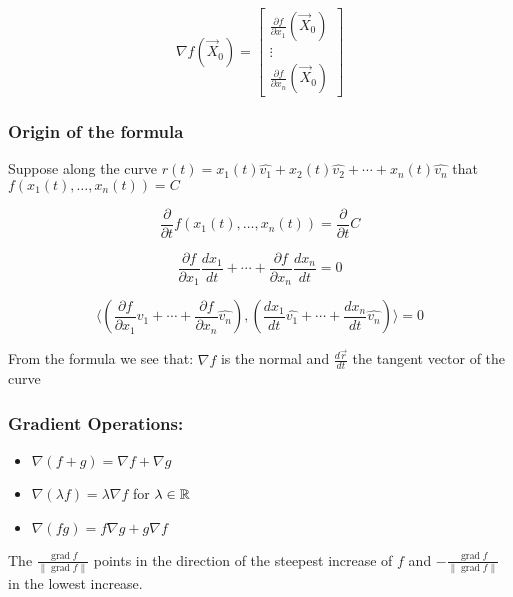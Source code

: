 \[
    \nabla f(\vec{X}_0) = \begin{bmatrix}
    \frac{\partial f}{\partial x_1}(\vec{X}_0) \\
    \vdots \\
    \frac{\partial f}{\partial x_n}(\vec{X}_0)
    \end{bmatrix}
\]

\subsubsection{Origin of the formula}

Suppose along the curve \(r(t) = x_1(t)\hat{v_1} + x_2(t)\hat{v_2} + \cdots + x_n(t)\hat{v_n}\) that 
\(f(x_1(t), \dots, x_n(t)) = C\)

\[
    \frac{\partial}{\partial t}f(x_1(t), \dots, x_n(t)) = \frac{\partial}{\partial t}C
\]

\[
    \frac{\partial f}{\partial x_1}\frac{dx_1}{dt} + \cdots + \frac{\partial f}{\partial x_n}
    \frac{dx_n}{dt} = 0
\]

\[
    \langle \left(\frac{\partial f}{\partial x_1}\hat{v_1} + \cdots + \frac{\partial f}{\partial x_n}
    \hat{v_n}\right) , \left( \frac{dx_1}{dt}\hat{v_1} + \cdots + \frac{dx_n}{dt}\hat{v_n}\right)\rangle = 0
\]

From the formula we see that: \(\nabla f\) is the normal and \(\frac{d\vec{r}}{dt}\) the tangent vector 
of the curve

\QED

\subsubsection{Gradient Operations:}

\begin{itemize}

    \item \( \nabla(f + g) = \nabla f + \nabla g \)

    \item \( \nabla(\lambda f) = \lambda \nabla f \) for \( \lambda \in \mathbb{R} \)

    \item \( \nabla(fg) = f \nabla g + g \nabla f \)

\end{itemize}

The \(\frac{\operatorname{grad}f}{\|\operatorname{grad}f\|}\) points in the direction of the 
steepest increase of \(f\) and \(- \frac{\operatorname{grad}f}{\|\operatorname{grad}f\|}\) in 
the lowest increase.

